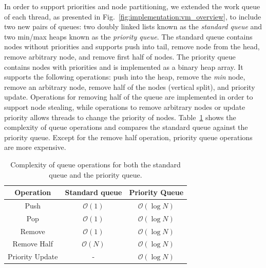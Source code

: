 In order to support priorities and node partitioning, we extended the work queue
of each thread, as presented in Fig.~\ref{fig:implementation:vm_overview}, to
include two new pairs of queues: two doubly linked lists known as the
\emph{standard queue} and two min/max heaps known as the \emph{priority queue}.
The standard queue contains nodes without priorities and supports push into
tail, remove node from the head, remove arbitrary node, and remove first half of
nodes.  The priority queue contains nodes with priorities and is implemented as
a binary heap array.  It supports the following operations: push into the heap,
remove the \emph{min} node, remove an arbitrary node, remove half of the nodes
(vertical split), and priority update.  Operations for removing half of the
queue are implemented in order to support node stealing, while operations to
remove arbitrary nodes or update priority allows threads to change the priority
of nodes.  Table~\ref{fig:implementation:table_queue} shows the complexity of
queue operations and compares the standard queue against the priority queue.
Except for the remove half operation, priority queue operations are more
expensive.

\begin{table}[h]
   \begin{tabular}{| c | c | c |}
      \hline
      \textbf{Operation} & \textbf{Standard queue} & \textbf{Priority Queue} \\
      \hline
      Push & $\mathcal{O}(1)$ & $\mathcal{O}(\log{N})$ \\ \hline
      Pop & $\mathcal{O}(1)$ & $\mathcal{O}(\log{N})$ \\ \hline
      Remove & $\mathcal{O}(1)$ & $\mathcal{O}(\log{N})$ \\ \hline
      Remove Half & $\mathcal{O}(N)$ & $\mathcal{O}(\log{N})$ \\ \hline
      Priority Update & - & $\mathcal{O}(\log{N})$ \\ \hline
   \end{tabular}
   \caption{Complexity of queue operations for both the standard
      queue and the priority queue.}
   \label{fig:implementation:table_queue}
\end{table}

